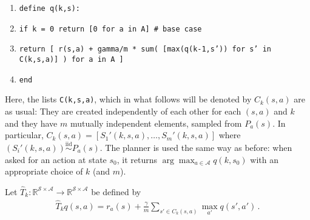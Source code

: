 \documentclass{article}
\newcommand{\R}{\mathbb{R}}
\DeclareMathOperator*{\1}{\mathbbm{1}}
\newcommand{\0}{\mathbf{0}}
\theoremstyle{definition}
\theoremstyle{remark}
\newcommand{\cS}{\mathcal{S}}
\newcommand{\cA}{\mathcal{A}}
\begin{document}
\begin{enumerate}
\item {\tt define q(k,s):}
\item {\tt if k = 0 return [0 for a in A] \# base case}
\item {\tt return [ r(s,a) + gamma/m * sum( [max(q(k-1,s')) for s' in C(k,s,a)] ) for a in A ]}
\item {\tt end}
\end{enumerate}

Here, the lists {\tt C(k,s,a)}, which in what follows will be denoted by $C_k(s,a)$ are as usual: They are created independently of each other for each $(s,a)$ and $k$ and they have $m$ mutually independent elements, sampled from $P_a(s)$.
In particular, $C_k(s,a) = [S_1'(k,s,a), \dots, S_m'(k,s,a)]$ where $(S_i'(k,s,a))\stackrel{\textrm{iid}}{\sim} P_a(s)$.
The planner is used the same way as before: when asked for an action at state $s_0$, it returns $\arg\max_{a\in \cA} q(k,s_0)$ with an appropriate choice of $k$ (and $m$).


Let $\hat T_k: \R^{\cS \times \cA} \to \R^{\cS \times \cA}$ be defined by 
\begin{align*}
\hat T_k q (s,a) = r_a(s) + \frac{\gamma}{m} \sum_{s'\in C_k(s,a)} \max_{a'} q(s',a')\,.
\end{align*}
\end{document}
